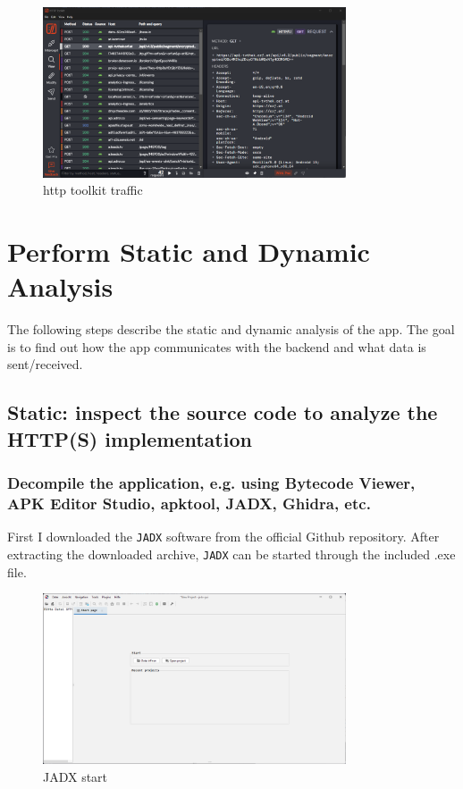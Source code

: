 \documentclass[12pt,a4paper]{article}
\begin{document}
\begin{figure}[H]
\centering
\includegraphics[width=0.8\textwidth]{./screenshots/httptoolkit.png}
\caption{http toolkit traffic}
\end{figure}

\section{Perform Static and Dynamic Analysis}

The following steps describe the static and dynamic analysis of the app. The goal is to find out how the app communicates with the backend and what data is sent/received.

\subsection{Static: inspect the source code to analyze the HTTP(S) implementation}

\subsubsection{Decompile the application, e.g. using Bytecode Viewer, APK Editor Studio, apktool, JADX, Ghidra, etc.}

First I downloaded the \texttt{JADX} software from the official Github repository. 
After extracting the downloaded archive, \texttt{JADX} can be started through the included .exe file.

\begin{figure}[H]
\centering
\includegraphics[width=0.8\textwidth]{./screenshots/jadx_initial.png}
\caption{JADX start}
\end{figure}
\end{document}
